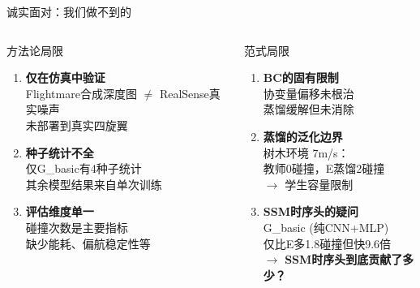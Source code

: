 \documentclass[aspectratio=169,10pt]{beamer}
\begin{document}
\begin{frame}{诚实面对：我们做不到的}
\begin{columns}[T]
\begin{block}{方法论局限}
\begin{enumerate}\footnotesize
\item \textbf{仅在仿真中验证}\\
Flightmare合成深度图 $\neq$ RealSense真实噪声\\
未部署到真实四旋翼
\item \textbf{种子统计不全}\\
仅G\_basic有4种子统计\\
其余模型结果来自单次训练
\item \textbf{评估维度单一}\\
碰撞次数是主要指标\\
缺少能耗、偏航稳定性等
\end{enumerate}
\end{block}

\begin{block}{范式局限}
\begin{enumerate}\footnotesize
\item \textbf{BC的固有限制}\\
协变量偏移未根治\\
蒸馏缓解但未消除
\item \textbf{蒸馏的泛化边界}\\
树木环境 7m/s：\\
教师0碰撞，E蒸馏2碰撞\\
$\to$ 学生容量限制
\item \textbf{SSM时序头的疑问}\\
G\_basic (纯CNN+MLP)\\
仅比E多1.8碰撞但快9.6倍\\
$\to$ \textbf{SSM时序头到底贡献了多少？}
\end{enumerate}
\end{block}
\end{columns}
\end{frame}
\end{document}
